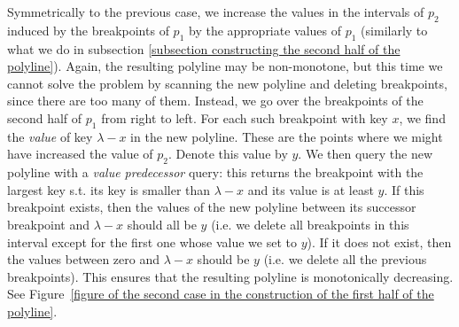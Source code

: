 \documentclass[a4paper,UKenglish]{lipics-v2016}
\theoremstyle{plain}
\begin{document}

\medskip {}
Symmetrically to the previous case, we increase the values in the intervals of $p_2$ induced by the breakpoints of $p_1$ by the appropriate values of $p_{1}$ (similarly to what we do in subsection \ref{subsection constructing the second half of the polyline}). Again, the resulting polyline may be non-monotone, but this time we cannot solve the problem by scanning the new polyline and deleting breakpoints, since there are too many of them. Instead, we go over the breakpoints of the second half of $p_1$ from right to left. For each such breakpoint  with key $x$, we find the {\em value} of key $\lambda - x$ in the new polyline. These are the points where we might have increased the value of $p_2$. Denote this value by $y$. We then query the new polyline with a \emph{value predecessor} query: this returns the breakpoint   with the largest key s.t. its key is smaller than $\lambda - x$ and its value is at least $y$. 
%
If this breakpoint exists, then the values of the new polyline between its successor breakpoint and $\lambda - x$ should all be $y$ (i.e. we delete all breakpoints in this interval except for the first one whose value we set to $y$). %
If it does not exist, then the values between zero and $\lambda - x$ should be $y$ (i.e. we delete all the previous breakpoints). 
This ensures that the resulting polyline is monotonically decreasing. 
See  Figure~\ref{figure of the second case in the construction of the first half of the polyline}.



\end{document}
